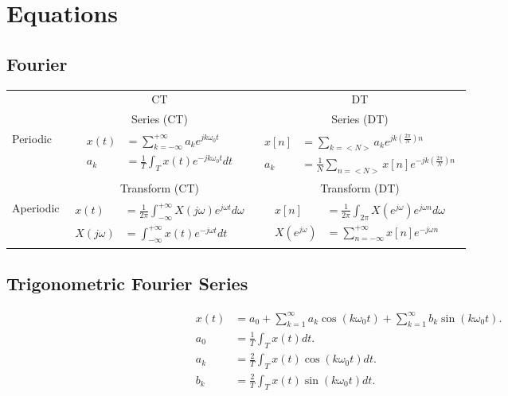 \section*{Equations}
\subsection*{Fourier}
{\centering
{\renewcommand{\arraystretch}{4}%
    \begin{tabular}{lcc}

    & CT & DT\\
        \cline{2-3}
    & Series (CT) & Series (DT)\\
    \cline{2-3}
    Periodic &
    $\begin{aligned}
        x(t) &= \sum_{k=-\infty}^{+\infty}a_k e^{jk\omega_0 t}\\
        a_k &= \frac{1}{T} \int_{T}x(t)e^{-jk\omega_0 t}dt
    \end{aligned}$\par

    &
    $\begin{aligned}
        x[n] &= \sum_{k=<N>}a_k e^{jk\left(\frac{2\pi}{N}\right) n}\\
        a_k &= \frac{1}{N} \sum_{n=<N>}x[n]e^{-jk\left(\frac{2\pi}{N}\right)n}
    \end{aligned}$\par
    \\[4ex]
        \cline{2-3}
     & Transform (CT) & Transform (DT)\\
    \cline{2-3}
    Aperiodic &
    $\begin{aligned}
        x(t) &= \frac{1}{2\pi}\int_{-\infty}^{+\infty} X(j\omega)e^{j\omega t}d\omega\\
        X(j\omega) &=  \int_{-\infty}^{+\infty}x(t)e^{-j\omega t}dt
    \end{aligned}$\par

    &


    $\begin{aligned}
        x[n] &= \frac{1}{2\pi}\int_{2\pi} X(e^{j\omega})e^{j\omega n}d\omega\\
        X(e^{j\omega}) &= \sum_{n=-\infty}^{+\infty}x[n]e^{-j\omega n}
    \end{aligned}$\par
    \\[4ex]
        \cline{2-3}
    \end{tabular}
    }
}
    \subsection*{Trigonometric Fourier Series}

    \begin{align*}
        x(t) &= a_0 + \sum_{k=1}^{\infty}a_k \cos(k\omega_0 t) + \sum_{k=1}^{\infty}b_k \sin(k\omega_0 t).\\
        a_0 &= \frac{1}{T}\int_T x(t)dt.\\
        a_k &= \frac{2}{T}\int_T x(t)\cos(k\omega_0 t)dt.\\
        b_k &= \frac{2}{T}\int_T x(t)\sin(k\omega_0 t)dt.
    \end{align*}
